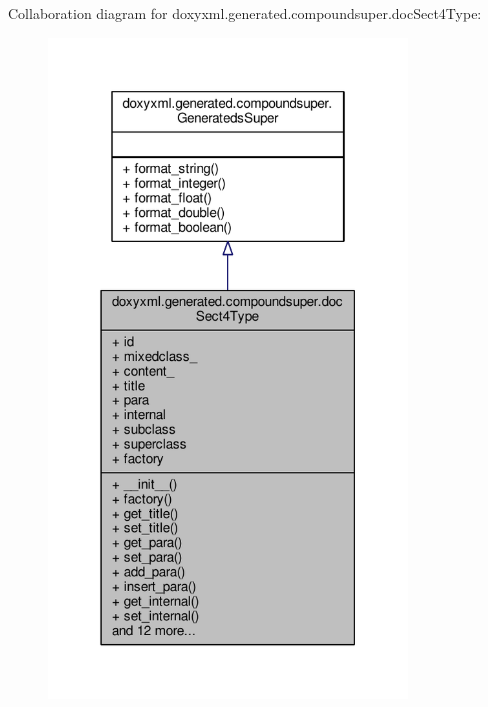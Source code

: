 Collaboration diagram for doxyxml.\+generated.\+compoundsuper.\+doc\+Sect4\+Type\+:
\nopagebreak
\begin{figure}[H]
\begin{center}
\leavevmode
\includegraphics[width=270pt]{df/d0e/classdoxyxml_1_1generated_1_1compoundsuper_1_1docSect4Type__coll__graph}
\end{center}
\end{figure}
